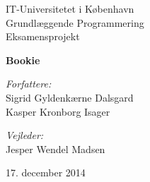 
\begin{titlepage}

\center

\LARGE{IT-Universitetet i København}\\[1.5cm]
\Large{Grundlæggende Programmering}\\[0.5cm]
\large{Eksamensprojekt}

\vfill

\huge{\bfseries Bookie}

\vfill

\begin{minipage}[t]{0.4\textwidth}
\begin{flushleft} \large
  \emph{Forfattere:}\\
  Sigrid Gyldenkærne Dalsgard \\
  Kasper Kronborg Isager
\end{flushleft}
\end{minipage}
\begin{minipage}[t]{0.4\textwidth}
\begin{flushright} \large
  \emph{Vejleder:} \\
  Jesper Wendel Madsen
\end{flushright}
\end{minipage}

\vfill

\large{17. december 2014}

\end{titlepage}

